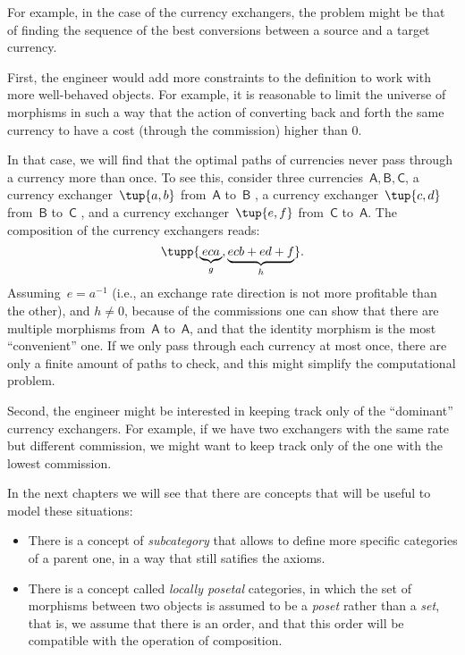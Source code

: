 For example, in the case of the currency exchangers, the problem might be that of finding the 
sequence of the best conversions between a source and a target currency. 

First, the engineer would add more constraints to the definition to work
with more well-behaved objects. For example, it is reasonable to limit the 
universe of morphisms in such a way that the action of converting back and forth the same currency to have a cost (through the commission) higher than 0. 

In that case, we will find that the optimal paths of currencies never pass through a currency more than once. To see this, consider three currencies~$\mathsf{A,B,C}$, a currency exchanger~$\tup{a,b}$ from~$\mathsf{A}$ to~$\mathsf{B}$ , a currency exchanger~$\tup{c,d}$ from~$\mathsf{B}$ to~$\mathsf{C}$ , and a currency exchanger~$\tup{e,f}$ from~$\mathsf{C}$ to~$\mathsf{A}$. The composition of the currency exchangers reads:
\begin{equation*}
\tupp{\underbrace{eca}_{g}, \underbrace{ecb+ed+f}_{h}}.
\end{equation*}
Assuming~$e=a^{-1}$ (i.e., an exchange rate direction is not more profitable than the other), and $h\neq 0$, because of the commissions one can show that there are multiple morphisms from~$\mathsf{A}$ to~$\mathsf{A}$, and that the identity morphism is the most ``convenient'' one.
If we only pass through each currency at most once, there are only a finite amount of paths to check, and this might simplify the computational problem.

Second, the engineer might be interested in keeping track only of the ``dominant'' currency exchangers.
For example, if we have two exchangers with the same rate but different commission, we might want 
to keep track only of the one with the lowest commission. 

In the next chapters we will see that there are concepts that will be useful to model these situations:
\begin{itemize}
    \item There is a concept of \emph{subcategory} that allows to define more specific 
    categories of a parent one, in a way that still satifies the axioms.
    \item There is a concept called \emph{locally posetal} categories, in which the 
    set of morphisms between two objects is assumed to be a \emph{poset} rather than a \emph{set},
    that is, we assume that there is an order, and that this order will be compatible with the operation of composition. 
\end{itemize}

